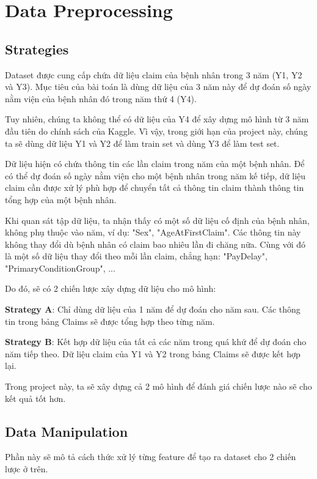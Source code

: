 \chapter{Data Preprocessing}

\section{Strategies}

Dataset được cung cấp chứa dữ liệu claim của bệnh nhân trong 3 năm (Y1, Y2 và Y3). Mục tiêu của bài toán là dùng dữ liệu của 3 năm này để dự đoán số ngày nằm viện của bệnh nhân đó trong năm thứ 4 (Y4).

Tuy nhiên, chúng ta không thể có dữ liệu của Y4 để xây dựng mô hình từ 3 năm đầu tiên do chính sách của Kaggle. Vì vậy, trong giới hạn của project này, chúng ta sẽ dùng dữ liệu Y1 và Y2 để làm train set và dùng Y3 để làm test set.

Dữ liệu hiện có chứa thông tin các lần claim trong năm của một bệnh nhân. Để có thể dự đoán số ngày nằm viện cho một bệnh nhân trong năm kế tiếp, dữ liệu claim cần được xử lý phù hợp để chuyển tất cả thông tin claim thành thông tin tổng hợp của một bệnh nhân.

Khi quan sát tập dữ liệu, ta nhận thấy có một số dữ liệu cố định của bệnh nhân, không phụ thuộc vào năm, ví dụ: "Sex", "AgeAtFirstClaim". Các thông tin này không thay đổi dù bệnh nhân có claim bao nhiêu lần đi chăng nữa. Cùng với đó là một số dữ liệu thay đổi theo mỗi lần claim, chẳng hạn: "PayDelay", "PrimaryConditionGroup", ...

Do đó, sẽ có 2 chiến lược xây dựng dữ liệu cho mô hình:

\textbf{Strategy A}: Chỉ dùng dữ liệu của 1 năm để dự đoán cho năm sau. Các thông tin trong bảng Claims sẽ được tổng hợp theo từng năm.

\textbf{Strategy B}: Kết hợp dữ liệu của tất cả các năm trong quá khứ để dự đoán cho năm tiếp theo. Dữ liệu claim của Y1 và Y2 trong bảng Claims sẽ được kết hợp lại.

Trong project này, ta sẽ xây dựng cả 2 mô hình để đánh giá chiến lược nào sẽ cho kết quả tốt hơn.

\section{Data Manipulation}

Phần này sẽ mô tả cách thức xử lý từng feature để tạo ra dataset cho 2 chiến lược ở trên.

